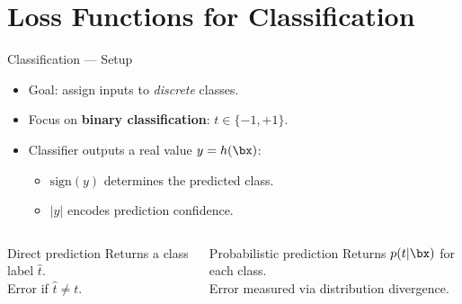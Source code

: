 \section{Loss Functions for Classification}

\begin{frame}{Classification — Setup}
  \begin{itemize}
    \item Goal: assign inputs to \emph{discrete} classes.
    \item Focus on \textbf{binary classification}: $t\in\{-1,+1\}$.
    \item Classifier outputs a real value $y=h(\bx)$:
      \begin{itemize}
        \item $\mathrm{sign}(y)$ determines the predicted class.
        \item $|y|$ encodes prediction confidence.
      \end{itemize}
  \end{itemize}
  \vspace{6pt}
  \begin{columns}[t]
      \begin{block}{Direct prediction}
        Returns a class label $\hat t$.\\
        Error if $\hat t\neq t$.
      \end{block}
      \begin{block}{Probabilistic prediction}
        Returns $p(t|\bx)$ for each class.\\
        Error measured via distribution divergence.
      \end{block}
  \end{columns}
\end{frame}

